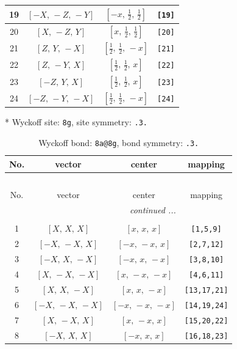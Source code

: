 \documentclass[fleqn,8pt]{jsarticle}
\begin{document}
\begin{longtable}{cccc}
19 & $\left[ - X,\, - Z,\, - Y \right]$ & $\left[ - x,\, \frac{1}{2},\, \frac{1}{2} \right]$ & {\tt [19]} \\ \hline
20 & $\left[ X,\, - Z,\, Y \right]$ & $\left[ x,\, \frac{1}{2},\, \frac{1}{2} \right]$ & {\tt [20]} \\ \hline
21 & $\left[ Z,\, Y,\, - X \right]$ & $\left[ \frac{1}{2},\, \frac{1}{2},\, - x \right]$ & {\tt [21]} \\ \hline
22 & $\left[ Z,\, - Y,\, X \right]$ & $\left[ \frac{1}{2},\, \frac{1}{2},\, x \right]$ & {\tt [22]} \\ \hline
23 & $\left[ - Z,\, Y,\, X \right]$ & $\left[ \frac{1}{2},\, \frac{1}{2},\, x \right]$ & {\tt [23]} \\ \hline
24 & $\left[ - Z,\, - Y,\, - X \right]$ & $\left[ \frac{1}{2},\, \frac{1}{2},\, - x \right]$ & {\tt [24]} \\
\end{longtable}
* Wyckoff site: {\tt 8g}, site symmetry: {\tt .3.}
\renewcommand{\arraystretch}{1.2}
\begin{longtable}{cccc}
\caption{Wyckoff bond: {\tt 8a@8g}, bond symmetry: {\tt .3.}}
 \\
 \hline \hline
No. & vector & center & mapping \\ \hline \endfirsthead

\multicolumn{3}{l}{\tablename\ \thetable{}} \\
 \hline \hline
No. & vector & center & mapping \\ \hline \endhead

 \hline \hline
\multicolumn{3}{r}{\footnotesize\it continued ...} \\ \endfoot

 \hline \hline
\multicolumn{3}{r}{} \\ \endlastfoot

1 & $\left[ X,\, X,\, X \right]$ & $\left[ x,\, x,\, x \right]$ & {\tt [1,5,9]} \\ \hline
2 & $\left[ - X,\, - X,\, X \right]$ & $\left[ - x,\, - x,\, x \right]$ & {\tt [2,7,12]} \\ \hline
3 & $\left[ - X,\, X,\, - X \right]$ & $\left[ - x,\, x,\, - x \right]$ & {\tt [3,8,10]} \\ \hline
4 & $\left[ X,\, - X,\, - X \right]$ & $\left[ x,\, - x,\, - x \right]$ & {\tt [4,6,11]} \\ \hline
5 & $\left[ X,\, X,\, - X \right]$ & $\left[ x,\, x,\, - x \right]$ & {\tt [13,17,21]} \\ \hline
6 & $\left[ - X,\, - X,\, - X \right]$ & $\left[ - x,\, - x,\, - x \right]$ & {\tt [14,19,24]} \\ \hline
7 & $\left[ X,\, - X,\, X \right]$ & $\left[ x,\, - x,\, x \right]$ & {\tt [15,20,22]} \\ \hline
8 & $\left[ - X,\, X,\, X \right]$ & $\left[ - x,\, x,\, x \right]$ & {\tt [16,18,23]} \\
\end{longtable}
\end{document}
